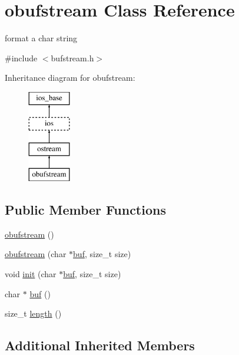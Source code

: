 \hypertarget{classobufstream}{}\section{obufstream Class Reference}
\label{classobufstream}


format a char string  




{\ttfamily \#include $<$bufstream.\+h$>$}

Inheritance diagram for obufstream\+:\begin{figure}[H]
\begin{center}
\leavevmode
\includegraphics[height=4.000000cm]{classobufstream}
\end{center}
\end{figure}
\subsection*{Public Member Functions}
\begin{DoxyCompactItemize}
\item 
\hyperlink{classobufstream_a74f7dbcf1131b77d3665aa85d6629722}{obufstream} ()
\item 
\hyperlink{classobufstream_a7af0555c5c08ebf9cbc70fc5e2f67db7}{obufstream} (char $\ast$\hyperlink{classobufstream_a4f699181bd3727f4288f4f95a5ce207f}{buf}, size\+\_\+t size)
\item 
void \hyperlink{classobufstream_a8f75dbadab2fed7770d01a2cc2628258}{init} (char $\ast$\hyperlink{classobufstream_a4f699181bd3727f4288f4f95a5ce207f}{buf}, size\+\_\+t size)
\item 
char $\ast$ \hyperlink{classobufstream_a4f699181bd3727f4288f4f95a5ce207f}{buf} ()
\item 
size\+\_\+t \hyperlink{classobufstream_ac650708e968b0c0545a3badeb809cf15}{length} ()
\end{DoxyCompactItemize}
\subsection*{Additional Inherited Members}


